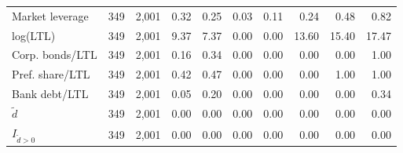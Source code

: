 \begin{threeparttable}
\begin{tabular}{lrrrrrrrrr}
Market leverage & 349 & 2,001 & 0.32 & 0.25 & 0.03 & 0.11 & 0.24 & 0.48 & 0.82 \\
log(LTL) & 349 & 2,001 & 9.37 & 7.37 & 0.00 & 0.00 & 13.60 & 15.40 & 17.47 \\
Corp. bonds/LTL & 349 & 2,001 & 0.16 & 0.34 & 0.00 & 0.00 & 0.00 & 0.00 & 1.00 \\
Pref. share/LTL & 349 & 2,001 & 0.42 & 0.47 & 0.00 & 0.00 & 0.00 & 1.00 & 1.00 \\
Bank debt/LTL & 349 & 2,001 & 0.05 & 0.20 & 0.00 & 0.00 & 0.00 & 0.00 & 0.34 \\
\ensuremath{\tilde{d}} & 349 & 2,001 & 0.00 & 0.00 & 0.00 & 0.00 & 0.00 & 0.00 & 0.00 \\
\ensuremath{I_{\tilde{d}>0}} & 349 & 2,001 & 0.00 & 0.00 & 0.00 & 0.00 & 0.00 & 0.00 & 0.00 \\
\bottomrule\end{tabular}\end{threeparttable}
